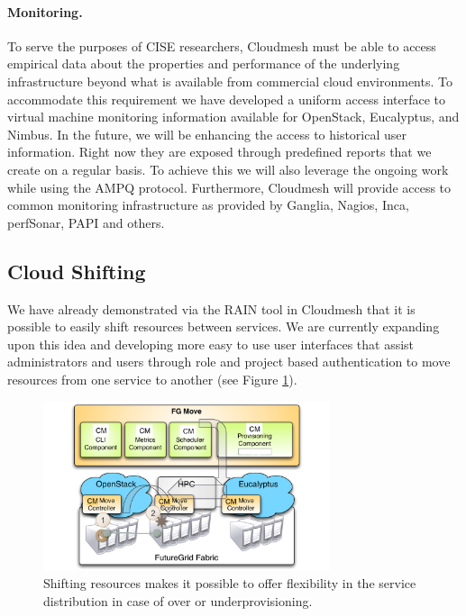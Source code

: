\documentclass[graybox]{svmult}
\begin{document}
\paragraph{Monitoring.}


To serve the purposes of CISE researchers, Cloudmesh must be able to access empirical data about the properties and performance of the underlying infrastructure beyond what is available from commercial cloud environments. To accommodate this requirement we have developed a uniform access interface to virtual machine monitoring information available for OpenStack, Eucalyptus, and Nimbus. In the future, we will be enhancing the access to historical user information. Right now they are exposed through predefined reports that we create on a regular basis. To achieve this we will also leverage the ongoing work while using the AMPQ protocol. Furthermore, Cloudmesh will provide access to common monitoring infrastructure as provided by Ganglia, Nagios, Inca, perfSonar, PAPI and others.




\subsection{Cloud Shifting}

We have already demonstrated via the RAIN tool in Cloudmesh that it is possible to easily shift resources between services. We are currently expanding upon this idea and developing more easy to use user interfaces that assist administrators and users through role and project based authentication to move resources from one service to another (see Figure \ref{F:shift}).


\begin{figure}[htb]
  \centering
    \includegraphics[width=0.75\textwidth]{images/shift2.pdf}
  \caption{Shifting resources makes it possible to offer flexibility
    in the service distribution in case of over or underprovisioning.}\label{F:shift}
\end{figure}
\end{document}
